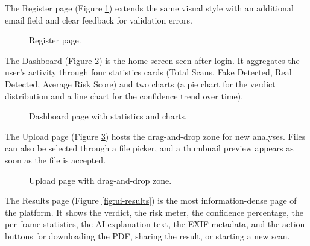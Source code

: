 The Register page (Figure \ref{fig:ui-register}) extends the same visual style with an additional email field and clear feedback for validation errors.

\begin{figure}[H]
\centering
{}
\caption{Register page.}
\label{fig:ui-register}
\end{figure}

The Dashboard (Figure \ref{fig:ui-dashboard}) is the home screen seen after login. It aggregates the user's activity through four statistics cards (Total Scans, Fake Detected, Real Detected, Average Risk Score) and two charts (a pie chart for the verdict distribution and a line chart for the confidence trend over time).

\begin{figure}[H]
\centering
{}
\caption{Dashboard page with statistics and charts.}
\label{fig:ui-dashboard}
\end{figure}

The Upload page (Figure \ref{fig:ui-upload}) hosts the drag-and-drop zone for new analyses. Files can also be selected through a file picker, and a thumbnail preview appears as soon as the file is accepted.

\begin{figure}[H]
\centering
{}
\caption{Upload page with drag-and-drop zone.}
\label{fig:ui-upload}
\end{figure}

The Results page (Figure \ref{fig:ui-results}) is the most information-dense page of the platform. It shows the verdict, the risk meter, the confidence percentage, the per-frame statistics, the AI explanation text, the EXIF metadata, and the action buttons for downloading the PDF, sharing the result, or starting a new scan.

